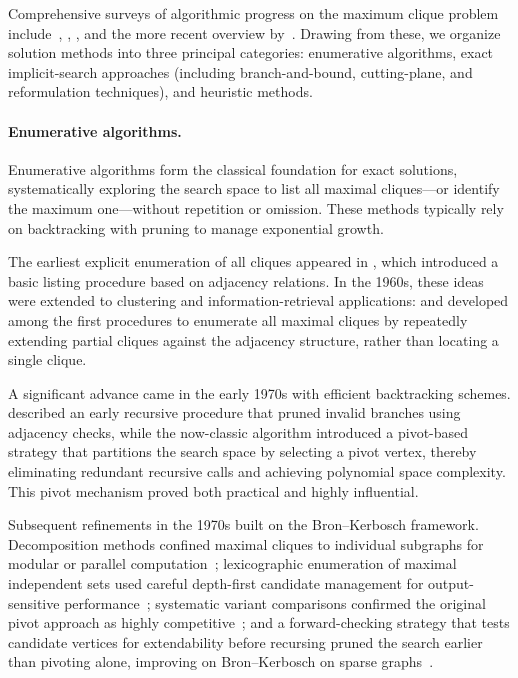 Comprehensive surveys of algorithmic progress on the maximum clique
problem include~\cite{PardalosXue1994}, \cite{Bomze99survey},
\cite{WU2015693}, and the more recent overview by~\cite{marino2024}.
Drawing from these, we organize solution methods into three principal
categories: enumerative algorithms, exact implicit-search approaches
(including branch-and-bound, cutting-plane, and reformulation
techniques), and heuristic methods.
\paragraph{Enumerative algorithms.}
Enumerative algorithms form the classical foundation for exact
solutions, systematically exploring the search space to list all
maximal cliques---or identify the maximum one---without repetition or
omission. These methods typically rely on backtracking with
pruning to manage exponential growth.

The earliest explicit enumeration of all cliques appeared in
\cite{HararyRoss57}, which introduced a basic listing procedure based
on adjacency relations. In the 1960s, these ideas were extended to
clustering and information-retrieval applications: \cite{Bonner64} and \cite{BednarekTaulbee66} developed among the first procedures to enumerate all maximal cliques by repeatedly extending partial cliques against the adjacency structure, rather than locating a single clique.

A significant advance came in the early 1970s with efficient
backtracking schemes. \cite{Akkoyunlu73} described an early recursive
procedure that pruned invalid branches using adjacency checks, while
the now-classic \cite{BronKerbosch73} algorithm introduced a
pivot-based strategy that partitions the search space by selecting a
pivot vertex, thereby eliminating redundant recursive calls and
achieving polynomial space complexity. This pivot mechanism proved both
practical and highly influential.

Subsequent refinements in the 1970s built on the Bron--Kerbosch
framework. Decomposition methods confined maximal cliques to individual
subgraphs for modular or parallel computation~\citep{meeusen1975};
lexicographic enumeration of maximal independent sets used careful
depth-first candidate management for output-sensitive
performance~\citep{johnson1975}; systematic variant comparisons
confirmed the original pivot approach as highly
competitive~\citep{johnston1976}; and a forward-checking strategy that tests candidate vertices for extendability {before} recursing pruned the search earlier than pivoting alone, improving on Bron--Kerbosch on sparse graphs~\citep{gerhards1979}.

